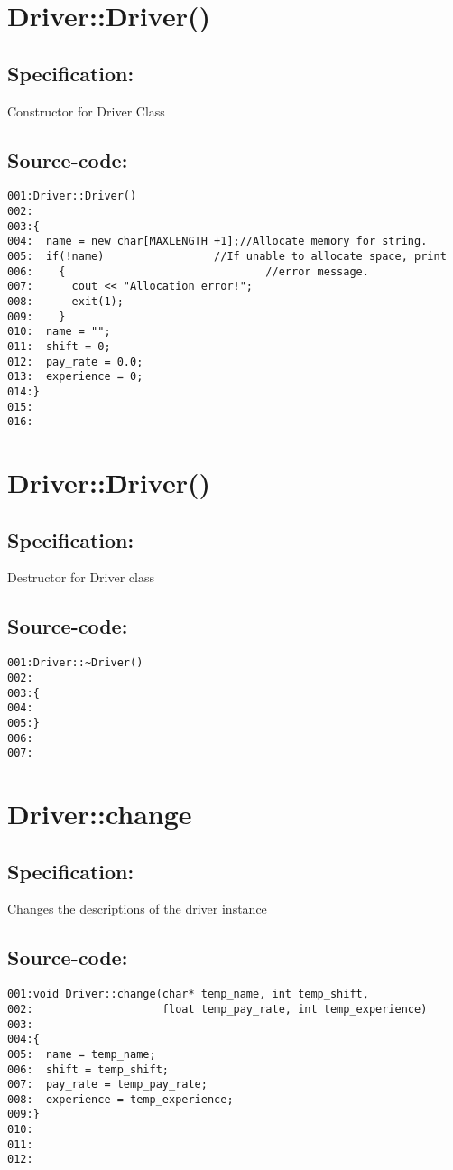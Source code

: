 \section{Driver::Driver()}
\subsection*{Specification:}
Constructor for Driver Class
\subsection*{Source-code:}
\begin{verbatim}
001:Driver::Driver()
002:
003:{
004:  name = new char[MAXLENGTH +1];//Allocate memory for string.
005:  if(!name)                 //If unable to allocate space, print
006:    {                               //error message.
007:      cout << "Allocation error!";
008:      exit(1);
009:    }
010:  name = "";
011:  shift = 0;
012:  pay_rate = 0.0;
013:  experience = 0;
014:}
015:
016:
\end{verbatim}
\section{Driver::\~Driver()}
\subsection*{Specification:}
Destructor for Driver class
\subsection*{Source-code:}
\begin{verbatim}
001:Driver::~Driver()
002:     
003:{
004:
005:}
006:
007:
\end{verbatim}
\section{Driver::change}
\subsection*{Specification:}
Changes the descriptions of the driver instance
\subsection*{Source-code:}
\begin{verbatim}
001:void Driver::change(char* temp_name, int temp_shift, 
002:                    float temp_pay_rate, int temp_experience)
003:
004:{
005:  name = temp_name;
006:  shift = temp_shift;
007:  pay_rate = temp_pay_rate;
008:  experience = temp_experience;
009:}
010:
011:
012:
\end{verbatim}
